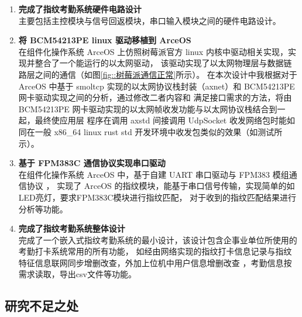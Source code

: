     \begin{enumerate}
        \item \textbf{完成了指纹考勤系统硬件电路设计} \\
        主要包括主控模块与信号回返模块，串口输入模块之间的硬件电路设计。
        \item \textbf{将 BCM54213PE linux 驱动移植到 ArceOS} \\
        在组件化操作系统 ArceOS 上仿照树莓派官方 linux 内核中驱动相关实现，实现并整合了一个能运行的以太网驱动，
        该驱动实现了以太网物理层与数据链路层之间的通信（如图\ref{fig::树莓派通信正常}所示）。
        在本次设计中我根据对于 ArceOS 中基于 smoltcp 实现的以太网协议栈封装（axnet）和 BCM54213PE 网卡驱动实现之间的分析，通过修改二者内容和
        满足接口需求的方法，将由 BCM54213PE 网卡驱动实现的以太网帧收发功能与以太网协议栈结合到一起，最终使应用层
        程序在调用 axstd 间接调用 UdpSocket 收发网络包时能如同在一般 x86\_64 linux rust std 开发环境中收发包类似的效果（如测试所示）。
        \item \textbf{基于 FPM383C 通信协议实现串口驱动} \\
        在组件化操作系统 ArceOS 中，基于自建 UART 串口驱动与 FPM383 模组通信协议 \cite{fpm383c-modular-communication-protocol}，
            实现了 ArceOS 的指纹模块，能基于串口信号传输，实现简单的如LED亮灯，要求FPM383C模块进行指纹匹配，
            对于收到的指纹匹配结果进行分析等功能。
        \item \textbf{完成了指纹考勤系统整体设计} \\ 
        完成了一个嵌入式指纹考勤系统的最小设计，该设计包含企事业单位所使用的考勤打卡系统常用的所有功能，
        如经由网络实现的指纹打卡信息记录与指纹特征信息联网同步增删改查，外加上位机中用户信息增删改查
        ，考勤信息按需求读取，导出csv文件等功能。
    \end{enumerate}

    \subsection{研究不足之处}

